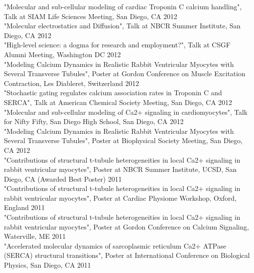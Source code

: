 \documentclass{res} %
\begin{document}
\begin{resume}
"Molecular and sub-cellular modeling of cardiac Troponin C calcium handling", Talk at SIAM Life Sciences Meeting, San Diego, CA  \hfill 2012 \\

"Molecular electrostatics and Diffusion", Talk at NBCR Summer Institute, San Diego, CA \hfill 2012 \\

"High-level science: a dogma for research and employment?", Talk at CSGF Alumni Meeting, Washington DC  \hfill 2012 \\

"Modeling Calcium Dynamics in Realistic Rabbit Ventricular Myocytes with Several Transverse Tubules", Poster at Gordon Conference on Muscle Excitation Contraction, Les Diableret, Switzerland  \hfill 2012 \\

"Stochastic gating regulates calcium association rates in Troponin C and SERCA", Talk at American Chemical Society Meeting, San Diego, CA \hfill 2012 \\

"Molecular and sub-cellular modeling of Ca2+ signaling in cardiomyocytes", Talk for Nifty Fifty, San Diego High School, San Diego, CA  \hfill 2012 \\

"Modeling Calcium Dynamics in Realistic Rabbit Ventricular Myocytes with Several Transverse Tubules", Poster at Biophysical Society Meeting, San Diego, CA  \hfill 2012 \\

"Contributions of structural t-tubule heterogeneities in local Ca2+ signaling in rabbit ventricular myocytes", Poster at NBCR Summer Institute, UCSD, San Diego, CA (Awarded Best Poster) \hfill 2011 \\

"Contributions of structural t-tubule heterogeneities in local Ca2+ signaling  in rabbit ventricular myocytes", Poster at Cardiac Physiome Workshop, Oxford, England \hfill 2011 \\

"Contributions of structural t-tubule heterogeneities in local Ca2+ signaling in rabbit ventricular myocytes", Poster at Gordon Conference on Calcium Signaling, Waterville, ME \hfill 2011 \\

"Accelerated molecular dynamics of sarcoplasmic reticulum  Ca2+ ATPase (SERCA) structural transitions", Poster at International Conference on Biological Physics, San Diego, CA \hfill 2011 \\


\end{resume}
\end{document}
